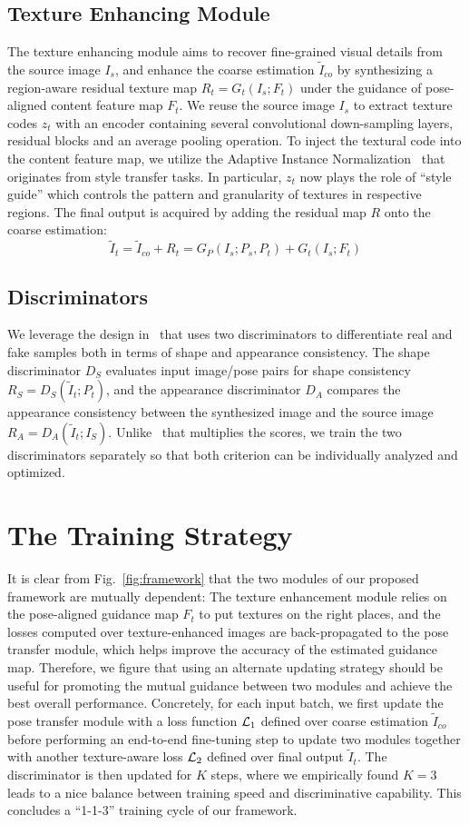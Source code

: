 \documentclass{article}
\begin{document}
\subsection{Texture Enhancing Module}
The texture enhancing module aims to recover fine-grained visual details from the source image $I_s$, and enhance the coarse estimation $\tilde{I}_{co}$ by synthesizing a region-aware residual texture map $R_t = G_t(I_s; F_t)$ under the guidance of pose-aligned content feature map $F_t$. We reuse the source image $I_s$ to extract texture codes $z_t$ with an encoder containing several convolutional down-sampling layers, residual blocks and an average pooling operation. To inject the textural code into the content feature map, we utilize the Adaptive Instance Normalization~\cite{adain} that originates from style transfer tasks. In particular, $z_t$ now plays the role of ``style guide'' which controls the pattern and granularity of textures in respective regions. The final output is acquired by adding the residual map $R$ onto the coarse estimation:
$$\tilde{I}_t = \tilde{I}_{co} + R_t = G_P(I_s; P_s, P_t) + G_t(I_s; F_t)$$


\subsection{Discriminators}
We leverage the design in~\cite{PATN} that uses two discriminators to differentiate real and fake samples both in terms of shape and appearance consistency. The shape discriminator $D_S$ evaluates input image/pose pairs for shape consistency $R_S = D_S(\tilde{I}_t; P_t)$, and the appearance discriminator $D_A$ compares the appearance consistency between the synthesized image and the source image $R_A = D_A(\tilde{I}_t; I_S)$. Unlike~\cite{PATN} that multiplies the scores, we train the two discriminators separately so that both criterion can be individually analyzed and optimized.

\section{The Training Strategy}

It is clear from Fig.~\ref{fig:framework} that the two modules of our proposed framework are mutually dependent: The texture enhancement module relies on the pose-aligned guidance map $F_t$ to put textures on the right places, and the losses computed over texture-enhanced images are back-propagated to the pose transfer module, which helps improve the accuracy of the estimated guidance map. Therefore, we figure that using an alternate updating strategy should be useful for promoting the mutual guidance between two modules and achieve the best overall performance. Concretely, for each input batch, we first update the pose transfer module with a loss function ${\cal L}_1$ defined over coarse estimation $\tilde{I}_{co}$ before performing an end-to-end fine-tuning step to update two modules together with another texture-aware loss ${\cal L}_2$ defined over final output $\tilde{I}_t$. The discriminator is then updated for $K$ steps, where we empirically found $K=3$ leads to a nice balance between training speed and discriminative capability. This concludes a ``1-1-3'' training cycle of our framework.
\end{document}
